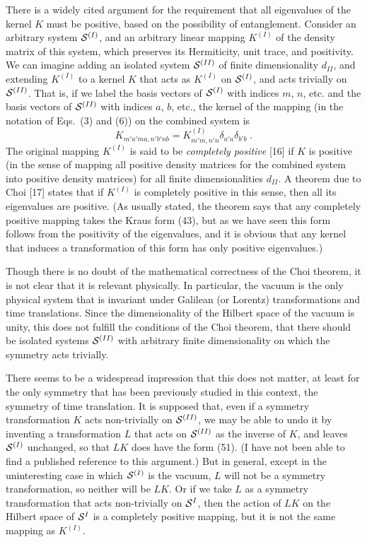 \documentclass[12pt]{article}
\begin{document}
There is a widely cited argument for the requirement that all eigenvalues of the kernel $K$ must be positive,  based on the possibility of entanglement.   Consider an arbitrary system ${\cal S}^{(I)}$, and an arbitrary linear mapping $K^{(I)}$ of the density matrix of this system, which preserves its Hermiticity,  unit trace, and positivity.  We can imagine adding an isolated system ${\cal S}^{(II)}$ of finite dimensionality $d_{II}$, and extending $K^{(I)}$ to a kernel $K$ that acts as $K^{(I)}$ on ${\cal S}^{(I)}$, and  acts trivially on ${\cal S}^{(II)}$.  That is, if we label the basis vectors of ${\cal S}^{(I)}$ with indices $m$, $n$, etc. and the 
basis vectors of ${\cal S}^{(II)}$ with indices $a$, $b$, etc.,
 the kernel of the mapping (in the notation of Eqs.~(3) and (6)) on the combined system is 
\begin{equation}
K_{m'a'ma,n'b'nb}=K^{(I)}_{m'm,n'n}\delta_{a'a}\delta_{b'b}\;.
\end{equation}
The original mapping $K^{(I)}$ is said to be {\em completely positive} [16] if $K$ is positive (in the sense of mapping all positive density matrices for the combined system into positive density matrices) for all finite dimensionalities $d_{II}$.  A theorem due to Choi [17] states that if $K^{(I)}$ is completely positive in this sense, then all its eigenvalues are positive.  (As usually stated, the theorem says that any completely positive mapping takes the Kraus form (43), but as we have seen this form follows from the positivity of the eigenvalues, and it is obvious that any kernel that induces a transformation of this form has only positive eigenvalues.)

Though there is no doubt of the mathematical correctness of the Choi theorem,  it is not clear that it is relevant physically.  In particular, the vacuum is the only physical system that is invariant under Galilean (or Lorentz) transformations and time translations.  Since the dimensionality of the Hilbert space of the vacuum is unity, this does not fulfill the conditions of the Choi theorem, that there should be isolated systems ${\cal S}^{(II)}$ with arbitrary finite dimensionality on which the symmetry acts trivially.  

There seems to be a widespread impression that this does not matter, at least for the only symmetry that has been previously studied in this context, the symmetry of time translation.  It is supposed that, even if a symmetry transformation $K$ acts non-trivially on ${\cal S}^{(II)}$, we may be able to undo it by inventing a transformation $L$ that acts on ${\cal S}^{(II)}$ as the inverse of $K$, and leaves ${\cal S}^{(I)}$ unchanged, so that $LK$ does have the form (51).  (I have not been able to find a published reference to this argument.)   But in general, except in the uninteresting case in which ${\cal S}^{(I)}$ is the vacuum, $L$ will not be a symmetry transformation, so neither will be $LK$.  Or if we take $L$ as a symmetry transformation that acts non-trivially on ${\cal S}^I$, then the action of $LK$ on the Hilbert space of ${\cal S}^I$ is a completely positive mapping, but it is not the same mapping as  $K^{(I)}$.
\end{document}
